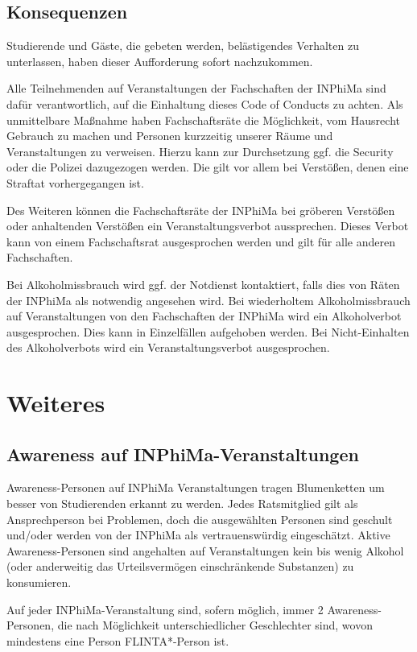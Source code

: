 \documentclass{article}
\begin{document}
\subsection{Konsequenzen}
Studierende und Gäste, die gebeten werden, belästigendes Verhalten zu unterlassen, haben dieser Aufforderung sofort nachzukommen.

Alle Teilnehmenden auf Veranstaltungen der Fachschaften der INPhiMa sind dafür verantwortlich, auf die Einhaltung dieses Code of Conducts zu achten. Als unmittelbare Maßnahme haben Fachschaftsräte die Möglichkeit, vom Hausrecht Gebrauch zu machen und Personen kurzzeitig unserer Räume und Veranstaltungen zu verweisen. Hierzu kann zur Durchsetzung ggf. die Security oder die Polizei dazugezogen werden. Die gilt vor allem bei Verstößen, denen eine Straftat vorhergegangen ist.
 
Des Weiteren können die Fachschaftsräte der INPhiMa bei gröberen Verstößen oder anhaltenden Verstö\-ßen ein Veranstaltungsverbot aussprechen. Dieses Verbot kann von einem Fachschaftsrat ausgesprochen werden und gilt für alle anderen Fachschaften. 

Bei Alkoholmissbrauch wird ggf. der Notdienst kontaktiert, falls dies von Räten der INPhiMa als notwendig angesehen wird. Bei wiederholtem Alkoholmissbrauch auf Veranstaltungen von den Fachschaften der INPhiMa wird ein Alkoholverbot ausgesprochen. Dies kann in Einzelfällen aufgehoben werden. Bei Nicht-Einhalten des Alkoholverbots wird ein Veranstaltungsverbot ausgesprochen.

\section{Weiteres}

\subsection{Awareness auf INPhiMa-Veranstaltungen}
Awareness-Personen auf INPhiMa Veranstaltungen tragen Blumenketten um besser von Studierenden erkannt zu werden. Jedes Ratsmitglied gilt als Ansprechperson bei Problemen, doch die ausgewählten Personen sind geschult und/oder werden von der INPhiMa als vertrauenswürdig eingeschätzt. Aktive Awareness-Personen sind angehalten auf Veranstaltungen kein bis wenig Alkohol (oder anderweitig das Urteilsvermögen einschränkende Substanzen) zu konsumieren.

Auf jeder INPhiMa-Veranstaltung sind, sofern möglich, immer 2 Awareness-Personen, die nach Mög\-lich\-keit unterschiedlicher Geschlechter sind, wovon mindestens eine Person FLINTA*-Person ist. %
\end{document}
